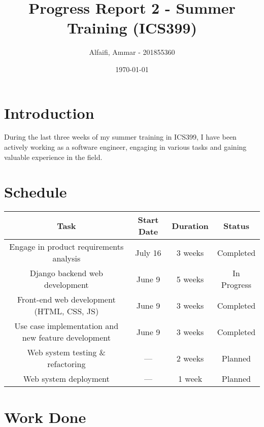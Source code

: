 \documentclass{article}
\title{Progress Report 2 - Summer Training (ICS399)}
\author{Alfaifi, Ammar - 201855360}
\date{\today}
\begin{document}
\maketitle

\section{Introduction}
During the last three weeks of my summer training in ICS399, I have been actively working as a software engineer, engaging in various tasks and gaining valuable experience in the field.

\section{Schedule}

\begin{tabular}{|c|c|c|c|}
	\hline
	\textbf{Task}                                       & \textbf{Start Date} & \textbf{Duration} & \textbf{Status} \\
	\hline
	Engage in product requirements analysis             & July 16          & 3 weeks           & Completed       \\
	Django backend web development                      & June 9          & 5 weeks           & In Progress     \\
	Front-end web development (HTML, CSS, JS)           & June 9          & 3 weeks           & Completed       \\
	Use case implementation and new feature development & June 9          & 3 weeks           & Completed       \\
	Web system testing \& refactoring                   & ---          & 2 weeks           & Planned         \\
	Web system deployment                               & ---          & 1 week            & Planned         \\
	\hline
\end{tabular}



\section{Work Done}
\end{document}
